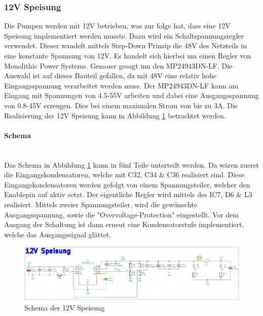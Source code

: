 \subsubsection{12V Speisung}
\label{subsubsec:12V Speisung}

Die Pumpen werden mit 12V betrieben, was zur folge hat, dass eine 12V Speisung implementiert werden musste. Dazu wird ein Schaltspannungsregler verwendet. Dieser wandelt mittels Step-Down Prinzip die 48V des Netzteils in eine konstante Spannung von 12V. Es handelt sich hierbei um einen Regler von Monolithic Power Systems. Genauer gesagt um den MP24943DN-LF. Die Auswahl ist auf dieses Bauteil gefallen, da mit 48V eine relativ hohe Eingangsspannung verarbeitet werden muss. Der MP24943DN-LF kann am Eingang mit Spannungen von 4.5-55V arbeiten und dabei eine Ausgangsspannung von 0.8-45V erzeugen. Dies bei einem maximalen Strom von bis zu 3A. Die Realisierung der 12V Speisung kann in Abbildung \ref{fig:Schema_Speisung_12V} betrachtet werden.\\

\paragraph{Schema}\mbox{}\\

Das Schema in Abbildung \ref{fig:Schema_Speisung_12V} kann in fünf Teile unterteilt werden. Da wären zuerst die Eingangskondensatoren, welche mit C32, C34 \& C36 realisiert sind. Diese Eingangskondensatoren werden gefolgt von einem Spannungsteiler, welcher den Enablepin auf aktiv setzt. Der eigentliche Regler wird mittels des IC7, D6 \& L3 realisiert. Mittels zweier Spannungsteiler, wird die gewünschte Ausgangsspannung, sowie die "Overvoltage-Protection" eingestellt. Vor dem Ausgang der Schaltung ist dann erneut eine Kondensatorstufe implementiert, welche das Ausgangssignal glättet.

\begin{figure}[h!]
	\centering
	\includegraphics[width=\textwidth]{graphics/Schema_Speisung_12V.png}
	\caption{Schema der 12V Speisung}
	\label{fig:Schema_Speisung_12V}
\end{figure} 

